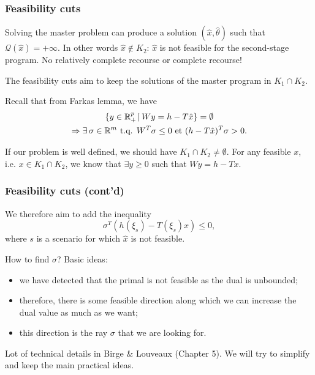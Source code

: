 \documentclass{beamer}
\begin{document}
\begin{frame}
\frametitle{Feasibility cuts}

Solving the master problem can produce a solution $(\hat{x}, \hat{\theta})$ such that $\mathcal{Q}(\hat{x}) = +\infty$.
In other words $\hat{x} \notin K_2$: $\hat{x}$ is not feasible for the second-stage program.
No relatively complete recourse or complete recourse!
	
\mbox{}
	
The {\blue feasibility cuts} aim to keep the solutions of the master program in $K_1 \cap K_2$.
	
\mbox{}
	
\mbox{}

Recall that from Farkas lemma, we have
\begin{multline*}
\lbrace y \in {\mathbb{R}}^p_+ \,|\, Wy = h-T\hat{x} \rbrace = \emptyset \\
\Rightarrow \exists\, \sigma \in {\mathbb{R}}^m \mbox{ t.q. } W^T\sigma \leq 0
\mbox{ et } (h-T\hat{x})^T\sigma > 0.
\end{multline*}

\mbox{}

If our problem is well defined, we should have $K_1 \cap K_2 \ne \emptyset$.
For any feasible $x$, i.e. $x \in K_1 \cap K_2$, we know that $\exists y \geq 0$ such that $Wy = h-Tx$.
	
\end{frame}

\begin{frame}
\frametitle{Feasibility cuts (cont'd)}

We therefore aim to add the inequality
\[
\sigma^T(h(\xi_s)-T(\xi_s)x) \leq 0,
\]
where $s$ is a scenario for which $\hat{x}$ is not feasible.
	
\mbox{}
	
How to find $\sigma$? Basic ideas:
\begin{itemize}
\item
we have detected that the primal is not feasible as the dual is unbounded;
\item
therefore, there is some feasible direction along which we can increase the dual value as much as we want;
\item
this direction is the ray $\sigma$ that we are looking for.
\end{itemize}

\mbox{}

Lot of technical details in Birge \& Louveaux (Chapter 5). We will try to simplify and keep the main practical ideas.
	
\end{frame}
\end{document}
